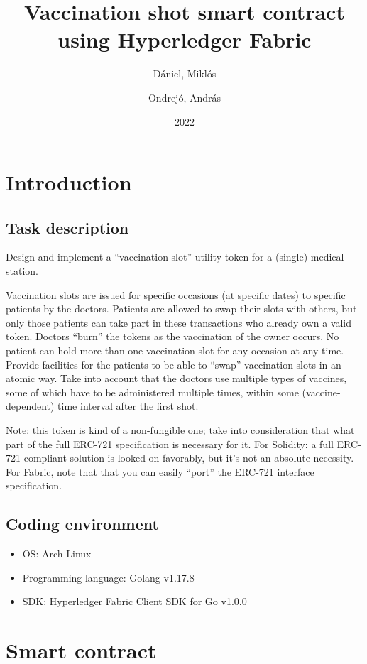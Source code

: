 \documentclass{article}
\author{
  Dániel, Miklós\\
  \IfFileExists{DM.txt}{
    \texttt{
        \begingroup
            \obeylines
            
        \endgroup
            }
  }{}  
  \and
  Ondrejó, András\\
  \IfFileExists{OA.txt}{
    \texttt{
        \begingroup
            \obeylines
            
        \endgroup
            }
  }{}  
}
\title{Vaccination shot smart contract using Hyperledger Fabric}
\date{2022}
\begin{document}
\maketitle
\newpage
\tableofcontents
\newpage
\section{Introduction}
\subsection{Task description}
Design and implement a “vaccination slot” utility token for a (single) medical station.\par
Vaccination slots are issued for specific occasions (at specific dates) to specific patients by the doctors. Patients are allowed to swap their slots with others, but only those patients can take part in these transactions who already own a valid token. Doctors “burn” the tokens as the vaccination of the owner occurs. No patient can hold more than one vaccination slot for any occasion at any time. Provide facilities for the patients to be able to “swap” vaccination slots in an atomic way. Take into account that the doctors use multiple types of vaccines, some of which have to be administered multiple times, within some (vaccine-dependent) time interval after the first shot.\par
Note: this token is kind of a non-fungible one; take into consideration that what part of the full ERC-721 specification is necessary for it. For Solidity: a full ERC-721 compliant solution is looked on favorably, but it's not an absolute necessity. For Fabric, note that that you can easily “port” the ERC-721 interface specification.

\subsection{Coding environment}
\begin{itemize}
  \item OS: Arch Linux
  \item Programming language: Golang v1.17.8
  \item SDK: \href{https://github.com/hyperledger/fabric-sdk-go}{Hyperledger Fabric Client SDK for Go} v1.0.0
\end{itemize}

\section{Smart contract}
\end{document}
